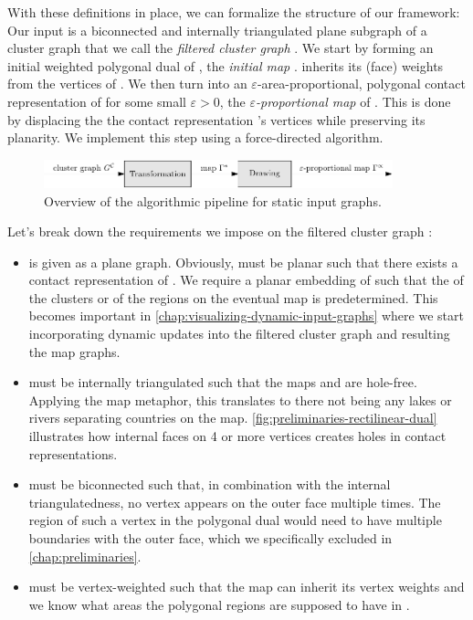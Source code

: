 With these definitions in place, we can formalize the structure of our framework:
Our input is a biconnected and internally triangulated plane subgraph of a cluster graph that we call the \emph{filtered cluster graph} \clustergraph{}.
We start by forming an initial weighted polygonal dual of \clustergraph{}, the \emph{initial map} \initmap{}.
\initmap{} inherits its (face) weights from the vertices of \clustergraph{}.
We then turn \initmap{} into an $\varepsilon$-area-proportional, polygonal contact representation of \clustergraph{} for some small $\varepsilon > 0$, the \emph{$\varepsilon$-proportional map} \propmap{} of \clustergraph{}.
This is done by displacing the the contact representation \initmap{}'s vertices while preserving its planarity.
We implement this step using a force-directed algorithm.

\begin{figure}[H]
	\centering\includegraphics[width=0.9\textwidth]{Resources/Framework-1.pdf}
	\caption{Overview of the algorithmic pipeline for static input graphs.}
	\label{fig:static-pipeline-thesis}
\end{figure}

Let's break down the requirements we impose on the filtered cluster graph \clustergraph{}:

\begin{itemize}
\item \clustergraph{} is given as a plane graph.
Obviously, \clustergraph{} must be planar such that there exists a contact representation of \clustergraph{}.
We require a planar embedding of \clustergraph{} such that the  of the clusters or of the regions on the eventual map is predetermined.
This becomes important in \cref{chap:visualizing-dynamic-input-graphs} where we start incorporating dynamic updates into the filtered cluster graph and resulting the map graphs.
\item \clustergraph{} must be internally triangulated such that the maps \initmap{} and \propmap{} are hole-free.
Applying the map metaphor, this translates to there not being any lakes or rivers separating countries on the map.
\cref{fig:preliminaries-rectilinear-dual} illustrates how internal faces on 4 or more vertices creates holes in contact representations.
\item \clustergraph{} must be biconnected such that, in combination with the internal triangulatedness, no vertex appears on the outer face multiple times.
The region of such a vertex in the polygonal dual would need to have multiple boundaries with the outer face, which we specifically excluded in \cref{chap:preliminaries}.
\item \clustergraph{} must be vertex-weighted such that the map \initmap{} can inherit its vertex weights and we know what areas the polygonal regions are supposed to have in \propmap{}.
\end{itemize}

